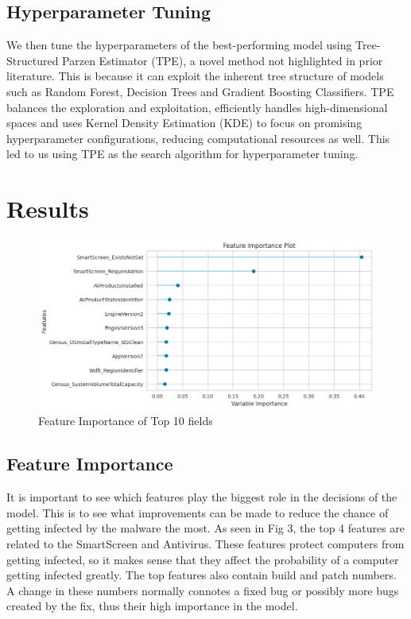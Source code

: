 \documentclass[pdflatex,sn-basic,Numbered]{sn-jnl}%
\theoremstyle{thmstyleone}%
\theoremstyle{thmstyletwo}%
\theoremstyle{thmstylethree}%
\begin{document}
\subsection{Hyperparameter Tuning}
We then tune the hyperparameters of the best-performing model using Tree-Structured Parzen Estimator (TPE), a novel method not highlighted in prior literature. This is because it can exploit the inherent tree structure of models such as Random Forest, Decision Trees and Gradient Boosting Classifiers. TPE balances the exploration and exploitation, efficiently handles high-dimensional spaces and uses Kernel Density Estimation (KDE) to focus on promising hyperparameter configurations, reducing computational resources as well. This led to us using TPE as the search algorithm for hyperparameter tuning.

\section{Results}

\begin{figure}[!h]
\includegraphics[scale=0.5]{images/importance.png}
\centering
\caption{Feature Importance of Top 10 fields}
\label{Fig 3}
\end{figure}

\subsection{Feature Importance} It is important to see which features play the biggest role in the decisions of the model. This is to see what improvements can be made to reduce the chance of getting infected by the malware the most. As seen in Fig 3, the top 4 features are related to the SmartScreen and Antivirus. These features protect computers from getting infected, so it makes sense that they affect the probability of a computer getting infected greatly. The top features also contain build and patch numbers. A change in these numbers normally connotes a fixed bug or possibly more bugs created by the fix, thus their high importance in the model. 
\end{document}
